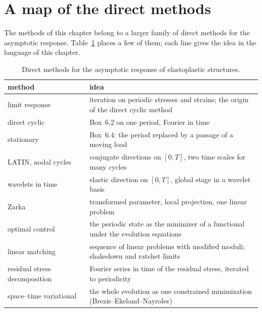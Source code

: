 \section{A map of the direct methods}\label{sec:cy-map}
%
The methods of this chapter belong to a larger family of direct methods for
the asymptotic response. Table~\ref{tab:cy-map} places a few of them; each
line gives the idea in the language of this chapter.

\begin{table}[h]
\centering\small
\renewcommand{\arraystretch}{1.15}
\begin{tabular}{@{}p{4.2cm}p{9.6cm}@{}}
\toprule
\sffamily method & \sffamily idea\\
\midrule
limit response~\cite{AkelNguyen1991} & iteration on periodic stresses and strains; the origin of the direct cyclic method\\
direct cyclic~\cite{MaoucheMaitournamDangVan1997,MaitournamPommierThomas2002} & Box~6.2 on one period, Fourier in time\\
stationary~\cite{NguyenRahimian1981,DangVanMaitournam1993} & Box~6.4: the period replaced by a passage of a moving load\\
LATIN, nodal cycles~\cite{LadevezeNCSM,CognardLadeveze1993} & conjugate directions on $[0,T]$, two time scales for many cycles\\
wavelets in time~\cite{ComteEtAl2006} & elastic direction on $[0,T]$, global stage in a wavelet basis\\
Zarka~\cite{ZarkaEtAl1990,MandelHalphenZarka1977} & transformed parameter, local projection, one linear problem\\
optimal control~\cite{PeigneyStolz2003} & the periodic state as the minimizer of a functional under the evolution equations\\
linear matching~\cite{PonterChen2001} & sequence of linear problems with modified moduli; shakedown and ratchet limits\\
residual stress decomposition~\cite{SpiliopoulosPanagiotou2012} & Fourier series in time of the residual stress, iterated to periodicity\\
space--time variational~\cite{CaoEtAl2021} & the whole evolution as one constrained minimization (Brezis--Ekeland--Nayroles)\\
\bottomrule
\end{tabular}
\caption{Direct methods for the asymptotic response of elastoplastic structures.}
\label{tab:cy-map}
\end{table}

